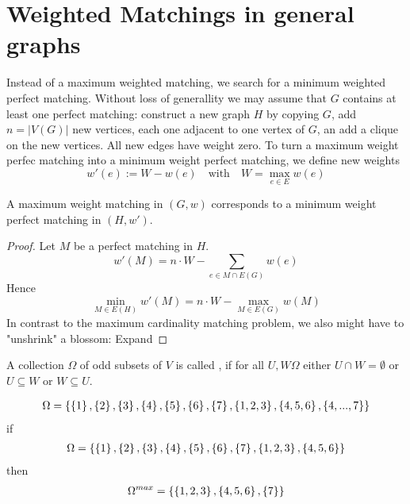\begin{lec}[2011-11-24]\end{lec}

\section*{Weighted Matchings in general graphs}
Instead of a maximum weighted matching, we search for a minimum weighted perfect matching. Without loss of generallity we may assume that $G$ contains at least one perfect matching: construct a new graph $H$ by copying $G$, add $n=|V(G)|$ new vertices, each one adjacent to one vertex of $G$, an add a clique on the new vertices. All new edges have weight zero. To turn a maximum weight perfec matching into a minimum weight perfect matching, we define new weights  \[w'(e):=W-w(e) \quad\text{with}\quad W = \max_{e\in E} w(e) \]
\begin{lem}
	A maximum weight matching in $(G,w)$ corresponds to a minimum weight perfect matching in $(H,w')$.
\end{lem}

\begin{proof}
	Let $M$ be a perfect matching in $H$.
	\[
		w'(M)= n \cdot W - \sum\limits_{e \in M \cap E(G)} w(e)
	\]
	Hence
	\[ 
		\min_{M \in E(H)} w'(M) = n \cdot W - \max_{M \in E(G)} w(M)
	\]
	In contrast to the maximum cardinality matching problem, we also might have to "unshrink" a blossom: Expand
\end{proof}

\begin{defn}
	 A collection $\Omega$ of odd subsets of $V$ is called , if for all $U,W \Omega$ either $U\cap W = \emptyset$ or $U \subseteq W$ or $W \subseteq U$.
\end{defn}

\begin{xmp+}
	\begin{align*}
		\Omega =  \left\{\left\{1\right\}, \left\{2\right\}, \left\{3\right\}, \left\{4\right\}, \left\{5\right\}, \left\{6\right\}, \left\{7\right\}, \left\{1,2,3\right\}, \left\{4,5,6\right\}, \left\{4, ..., 7\right\}\right\}
	\end{align*}
	if
	\begin{align*}
		\Omega =  \left\{\left\{1\right\}, \left\{2\right\}, \left\{3\right\}, \left\{4\right\}, \left\{5\right\}, \left\{6\right\}, \left\{7\right\}, \left\{1,2,3\right\}, \left\{4,5,6\right\}\right\}
	\end{align*}
	then 
	\begin{align*}
		\Omega^{max} =  \left\{\left\{1,2,3\right\}, \left\{4,5,6\right\}, \left\{7\right\}\right\}
	\end{align*}
\end{xmp+}

